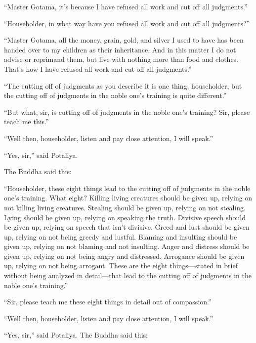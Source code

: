 \documentclass[12pt,openany]{book}%
\begin{document}
“Master Gotama, it’s because I have refused all work and cut off all judgments.” 

“Householder, in what way have you refused all work and cut off all judgments?” 

“Master Gotama, all the money, grain, gold, and silver I used to have has been handed over to my children as their inheritance. And in this matter I do not advise or reprimand them, but live with nothing more than food and clothes. That’s how I have refused all work and cut off all judgments.” 

“The cutting off of judgments as you describe it is one thing, householder, but the cutting off of judgments in the noble one’s training is quite different.” 

“But what, sir, is cutting off of judgments in the noble one’s training? Sir, please teach me this.” 

“Well then, householder, listen and pay close attention, I will speak.” 

“Yes, sir,” said Potaliya. 

The Buddha said this: 

“Householder, these eight things lead to the cutting off of judgments in the noble one’s training. What eight? Killing living creatures should be given up, relying on not killing living creatures. Stealing should be given up, relying on not stealing. Lying should be given up, relying on speaking the truth. Divisive speech should be given up, relying on speech that isn’t divisive. Greed and lust should be given up, relying on not being greedy and lustful. Blaming and insulting should be given up, relying on not blaming and not insulting. Anger and distress should be given up, relying on not being angry and distressed. Arrogance should be given up, relying on not being arrogant. These are the eight things—stated in brief without being analyzed in detail—that lead to the cutting off of judgments in the noble one’s training.” 

“Sir, please teach me these eight things in detail out of compassion.” 

“Well then, householder, listen and pay close attention, I will speak.” 

“Yes, sir,” said Potaliya. The Buddha said this: 
\end{document}
